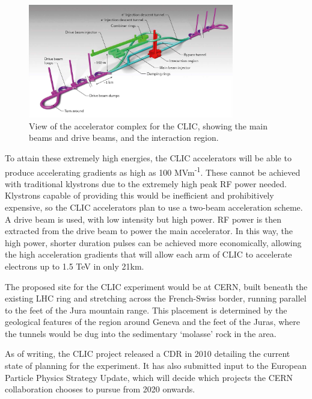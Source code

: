 \begin{figure}[h]
	\centering
	\includegraphics[width=0.8\textwidth]{../Pictures/CLIC-Render.jpg}
	\caption{View of the accelerator complex for the \acrlong{CLIC}, showing the main beams and drive beams, and the interaction region.}
	\label{figure:colliders/CLIC/main}
\end{figure}

To attain these extremely high energies, the \acrshort{CLIC} accelerators will be able to produce accelerating gradients as high as 100 MVm\textsuperscript{-1}. These cannot be achieved with traditional klystrons due to the extremely high peak \acrshort{RF} power needed. Klystrons capable of providing this would be inefficient and prohibitively expensive, so the \acrshort{CLIC} accelerators plan to use a two-beam acceleration scheme. A drive beam is used, with low intensity but high power. \acrshort{RF} power is then extracted from the drive beam to power the main accelerator. In this way, the high power, shorter duration pulses can be achieved more economically, allowing the high acceleration gradients that will allow each arm of \acrshort{CLIC} to accelerate electrons up to 1.5 TeV in only 21km.

The proposed site for the \acrshort{CLIC} experiment would be at \acrshort{CERN}, built beneath the existing \acrshort{LHC} ring and stretching across the French-Swiss border, running parallel to the feet of the Jura mountain range. This placement is determined by the geological features of the region around Geneva and the feet of the Juras, where the tunnels would be dug into the sedimentary `molasse' rock in the area. 

As of writing, the \acrshort{CLIC} project released a \acrfull{CDR} in 2010 detailing the current state of planning for the experiment. It has also submitted input to the European Particle Physics Strategy Update, which will decide which projects the \acrshort{CERN} collaboration chooses to pursue from 2020 onwards.

